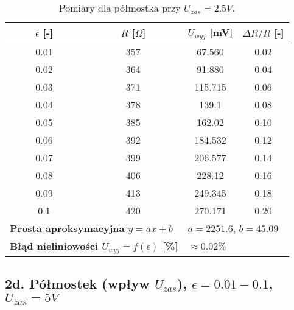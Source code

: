 \documentclass[12pt, a4paper]{article}
\begin{document}
	\begin{table}[H]
		\centering
		\caption{Pomiary dla półmostka przy $U_{zas} = 2.5 V$.}
		\begin{tabular}{cccc}
			\toprule
			$\epsilon$ [-] & $R$ [$\Omega$] & $U_{wyj}$ [mV] & $\Delta R/R$ [-] \\
			\midrule
			0.01 & 357 & 67.560 & 0.02 \\
			0.02 & 364 & 91.880 & 0.04 \\
			0.03 & 371 & 115.715 & 0.06 \\
			0.04 & 378 & 139.1 & 0.08 \\
			0.05 & 385 & 162.02 & 0.10 \\
			0.06 & 392 & 184.532 & 0.12 \\
			0.07 & 399 & 206.577 & 0.14 \\
			0.08 & 406 & 228.12 & 0.16 \\
			0.09 & 413 & 249.345 & 0.18 \\
			0.1 & 420 & 270.171 & 0.20 \\
			\midrule
			\multicolumn{2}{l}{\textbf{Prosta aproksymacyjna $y = ax + b$}} & \multicolumn{2}{l}{$a = 2251.6$, $b = 45.09$} \\
			\multicolumn{2}{l}{\textbf{Błąd nieliniowości $U_{wyj} = f(\epsilon)$ [\%]}} & \multicolumn{2}{l}{$\approx 0.02 \%$} \\
			\bottomrule
		\end{tabular}
	\end{table}
	
	\subsection{2d. Półmostek (wpływ $U_{zas}$), $\epsilon = 0.01-0.1$, $U_{zas} = 5 V$}
	
\end{document}
